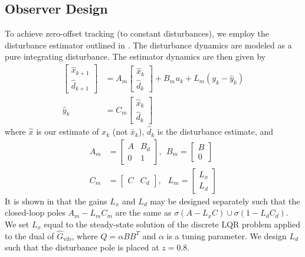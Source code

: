 \documentclass[twocolumn,twoside]{IEEEtran}
\newcommand{\x}{\ensuremath{x }\xspace}
\newcommand{\hGv}{\ensuremath{\hat{G}_{\text{vib}}}\xspace}
\begin{document}
\subsection{Observer Design}\label{sec:dist_est}
To achieve zero-offset tracking (to constant disturbances), we employ the disturbance estimator outlined in \cite{maeder_offset-free_2007}. The disturbance dynamics are modeled as a pure integrating disturbance. The estimator dynamics are then given by
\begin{align}
  \begin{bmatrix} \hat{\x}_{k+1}\\ \hat{d}_{k+1} \end{bmatrix}
  &= A_m
  \begin{bmatrix} \hat{\x}_{k}\\ \hat{d}_k\end{bmatrix}
    + B_m u_k + L_m(y_k - \hat y_k) \label{eqn:obsdyn}\\
  \hat y_k &= C_m\begin{bmatrix} \hat{\x}_k\label{eqn:yhat}\\
    \hat{d}_k \end{bmatrix}
\end{align}
where $\hat{x}$ is our estimate of $x_k$ (not $\bar{x}_k$), $\hat{d}_k$ is the disturbance estimate, and 
\begin{align}
  A_m& = \begin{bmatrix}
    A & B_d \\ 0 & 1
  \end{bmatrix},\:\:
  B_m =
  \begin{bmatrix}
    B \\ 0
  \end{bmatrix} \nonumber\\
  C_m &= 
    \begin{bmatrix}
    C & C_d
  \end{bmatrix},\:\:\;
  L_m = \begin{bmatrix} L_x\\L_d \end{bmatrix} \label{eqn:CmLm}
\end{align}
It is shown in \cite{maeder_offset-free_2007} that the gains $L_x$ and $L_d$ may be designed separately such that the closed-loop poles $A_m - L_mC_m$ are the same as $\sigma(A-L_xC)\cup \sigma(1-L_dC_d)$.
We set $L_x$ equal to the steady-state solution of the discrete LQR problem applied to the dual of $\hGv$, where $Q = \alpha BB^T$ and $\alpha$ is a tuning parameter. We design $L_d$ such that the disturbance pole is placed at $z=0.8$.
\end{document}
